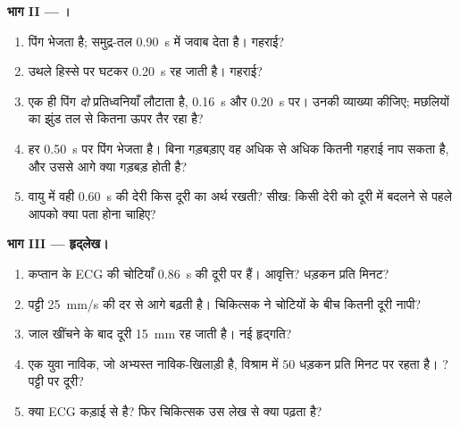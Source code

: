 \begin{problem}[{सप्ताहांत समस्या --- दुनिया के संकेत पढ़ना: एक ही नियम,
$d = v\,t$, जो तूफ़ान की दूरी नापता है, समुद्र-तल का नक्शा बनाता है, धड़कनें
गिनता है और GPS का भेद भी खोल देता है}]
\medskip
\noindent\textbf{भाग II --- ।}
\begin{enumerate}[resume]
  \item {} पिंग भेजता है; समुद्र-तल \qty{0.90}{s} में जवाब देता है।
        गहराई?
  \item उथले हिस्से पर  घटकर \qty{0.20}{s} रह जाती है।
        गहराई?
  \item एक ही पिंग \emph{दो} प्रतिध्वनियाँ लौटाता है, \qty{0.16}{s}
        और \qty{0.20}{s} पर। उनकी व्याख्या कीजिए; मछलियों का झुंड तल से कितना
        ऊपर तैर रहा है?
  \item {} हर \qty{0.50}{s} पर पिंग भेजता है। बिना गड़बड़ाए वह
        अधिक से अधिक कितनी गहराई नाप सकता है, और उससे आगे क्या गड़बड़
        होती है?
  \item वायु में वही \qty{0.60}{s} की देरी किस दूरी का अर्थ रखती? सीख: किसी
        देरी को दूरी में बदलने से पहले आपको क्या पता होना चाहिए?
\end{enumerate}

\medskip
\noindent\textbf{भाग III --- हृद्लेख।}
\begin{enumerate}[resume]
  \item कप्तान के ECG की चोटियाँ \qty{0.86}{s} की दूरी पर हैं।
        आवृत्ति? धड़कन प्रति मिनट?
  \item पट्टी \qty{25}{mm/s} की दर से आगे बढ़ती है। चिकित्सक ने चोटियों के बीच
        कितनी दूरी नापी?
  \item जाल खींचने के बाद दूरी \qty{15}{mm} रह जाती है। नई हृद्गति?
  \item एक युवा नाविक, जो अभ्यस्त नाविक-खिलाड़ी है, विश्राम में $50$
        धड़कन प्रति मिनट पर रहता है। ? पट्टी पर दूरी?
  \item क्या ECG कड़ाई से  है? फिर चिकित्सक उस लेख से
        क्या पढ़ता है?
\end{enumerate}


\end{problem}

